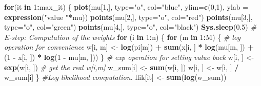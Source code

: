 \documentclass[
]{article}
\newenvironment{Shaded}{\begin{snugshade}}{\end{snugshade}}
\newcommand{\AttributeTok}[1]{\textcolor[rgb]{0.13,0.29,0.53}{#1}}
\newcommand{\CommentTok}[1]{\textcolor[rgb]{0.56,0.35,0.01}{\textit{#1}}}
\newcommand{\ControlFlowTok}[1]{\textcolor[rgb]{0.13,0.29,0.53}{\textbf{#1}}}
\newcommand{\DecValTok}[1]{\textcolor[rgb]{0.00,0.00,0.81}{#1}}
\newcommand{\FloatTok}[1]{\textcolor[rgb]{0.00,0.00,0.81}{#1}}
\newcommand{\FunctionTok}[1]{\textcolor[rgb]{0.13,0.29,0.53}{\textbf{#1}}}
\newcommand{\NormalTok}[1]{#1}
\newcommand{\OtherTok}[1]{\textcolor[rgb]{0.56,0.35,0.01}{#1}}
\newcommand{\SpecialCharTok}[1]{\textcolor[rgb]{0.81,0.36,0.00}{\textbf{#1}}}
\newcommand{\StringTok}[1]{\textcolor[rgb]{0.31,0.60,0.02}{#1}}
\begin{document}
\begin{Shaded}
\begin{Highlighting}[]
\ControlFlowTok{for}\NormalTok{(it }\ControlFlowTok{in} \DecValTok{1}\SpecialCharTok{:}\NormalTok{max\_it) \{}
  \FunctionTok{plot}\NormalTok{(mu[}\DecValTok{1}\NormalTok{,], }\AttributeTok{type=}\StringTok{"o"}\NormalTok{, }\AttributeTok{col=}\StringTok{"blue"}\NormalTok{, }\AttributeTok{ylim=}\FunctionTok{c}\NormalTok{(}\DecValTok{0}\NormalTok{,}\DecValTok{1}\NormalTok{), }\AttributeTok{ylab =} \FunctionTok{expression}\NormalTok{(}\StringTok{"value "}\SpecialCharTok{*}\NormalTok{mu))}
  \FunctionTok{points}\NormalTok{(mu[}\DecValTok{2}\NormalTok{,], }\AttributeTok{type=}\StringTok{"o"}\NormalTok{, }\AttributeTok{col=}\StringTok{"red"}\NormalTok{)}
  \FunctionTok{points}\NormalTok{(mu[}\DecValTok{3}\NormalTok{,], }\AttributeTok{type=}\StringTok{"o"}\NormalTok{, }\AttributeTok{col=}\StringTok{"green"}\NormalTok{)}
  \FunctionTok{points}\NormalTok{(mu[}\DecValTok{4}\NormalTok{,], }\AttributeTok{type=}\StringTok{"o"}\NormalTok{, }\AttributeTok{col=}\StringTok{"black"}\NormalTok{)}
  \FunctionTok{Sys.sleep}\NormalTok{(}\FloatTok{0.5}\NormalTok{)}
  \CommentTok{\# E{-}step: Computation of the weights}
  \ControlFlowTok{for}\NormalTok{ (i }\ControlFlowTok{in} \DecValTok{1}\SpecialCharTok{:}\NormalTok{n) \{}
    \ControlFlowTok{for}\NormalTok{ (m }\ControlFlowTok{in} \DecValTok{1}\SpecialCharTok{:}\NormalTok{M) \{}
      \CommentTok{\# log operation for convenience}
\NormalTok{      w[i, m] }\OtherTok{\textless{}{-}} \FunctionTok{log}\NormalTok{(pi[m]) }\SpecialCharTok{+} \FunctionTok{sum}\NormalTok{(x[i, ] }\SpecialCharTok{*} \FunctionTok{log}\NormalTok{(mu[m, ]) }\SpecialCharTok{+}\NormalTok{ (}\DecValTok{1} \SpecialCharTok{{-}}\NormalTok{ x[i, ]) }\SpecialCharTok{*} \FunctionTok{log}\NormalTok{(}\DecValTok{1} \SpecialCharTok{{-}}\NormalTok{ mu[m, ]))}
\NormalTok{    \}}
    \CommentTok{\# exp operation for setting value back}
\NormalTok{    w[i, ] }\OtherTok{\textless{}{-}} \FunctionTok{exp}\NormalTok{(w[i, ])}
    \CommentTok{\# get the real w[i,m]}
\NormalTok{    w\_sum[i] }\OtherTok{\textless{}{-}} \FunctionTok{sum}\NormalTok{(w[i, ])}
\NormalTok{    w[i, ] }\OtherTok{\textless{}{-}}\NormalTok{ w[i, ] }\SpecialCharTok{/}\NormalTok{ w\_sum[i]}
\NormalTok{  \}}
  \CommentTok{\#Log likelihood computation.}
\NormalTok{  llik[it] }\OtherTok{\textless{}{-}} \FunctionTok{sum}\NormalTok{(}\FunctionTok{log}\NormalTok{(w\_sum))}
  

\end{Highlighting}
\end{Shaded}
\end{document}
